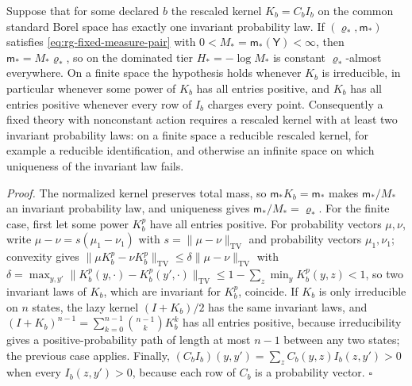 Suppose that for some declared \(b\) the rescaled kernel \(K_b=C_bI_b\) on the
common standard Borel space has exactly one invariant probability law. If
\((\varrho_*,\mathsf m_*)\) satisfies \eqref{eq:rg-fixed-measure-pair} with
\(0<M_*=\mathsf m_*(\mathsf Y)<\infty\), then \(\mathsf m_*=M_*\varrho_*\), so on the dominated
tier \(H_*=-\log M_*\) is constant \(\varrho_*\)-almost everywhere. On a finite
space the hypothesis holds whenever \(K_b\) is irreducible, in particular
whenever some power of \(K_b\) has all entries positive, and \(K_b\) has all
entries positive whenever every row of \(I_b\) charges every point.
Consequently a fixed theory with nonconstant action requires a rescaled kernel
with at least two invariant probability laws: on a finite space a reducible
rescaled kernel, for example a reducible identification, and otherwise an
infinite space on which uniqueness of the invariant law fails.

\noindent\emph{Proof.}
The normalized kernel preserves total mass, so \(\mathsf m_*K_b=\mathsf m_*\) makes \(\mathsf m_*/M_*\)
an invariant probability law, and uniqueness gives \(\mathsf m_*/M_*=\varrho_*\). For the
finite case, first let some power \(K_b^p\) have all entries positive. For
probability vectors \(\mu,\nu\), write \(\mu-\nu=s(\mu_1-\nu_1)\) with
\(s=\lVert\mu-\nu\rVert_{\mathrm{TV}}\) and probability vectors
\(\mu_1,\nu_1\); convexity gives
\(\lVert\mu K_b^p-\nu K_b^p\rVert_{\mathrm{TV}}\leq\delta\lVert\mu-\nu\rVert_{\mathrm{TV}}\)
with \(\delta=\max_{y,y'}\lVert K_b^p(y,\cdot)-K_b^p(y',\cdot)\rVert_{\mathrm{TV}}
\leq1-\sum_z\min_yK_b^p(y,z)<1\), so two invariant laws of \(K_b\), which are
invariant for \(K_b^p\), coincide. If \(K_b\) is only irreducible on \(n\)
states, the lazy kernel \((I+K_b)/2\) has the same invariant laws, and
\((I+K_b)^{n-1}=\sum_{k=0}^{n-1}\binom{n-1}{k}K_b^k\) has all entries positive,
because irreducibility gives a positive-probability path of length at most
\(n-1\) between any two states; the previous case applies. Finally,
\((C_bI_b)(y,y')=\sum_zC_b(y,z)I_b(z,y')>0\) when every \(I_b(z,y')>0\), because
each row of \(C_b\) is a probability vector. \(\square\)

